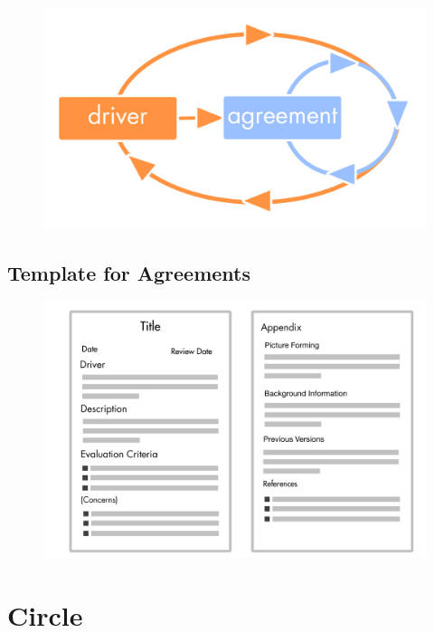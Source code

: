 \begin{figure}[htbp]
\centering
\includegraphics[keepaspectratio,width=\textwidth,height=0.75\textheight]{img/tension-driver-domain/driver-agreement-improvement.png}
\end{figure}

\subsection{Template for Agreements}
\label{templateforagreements}

\begin{figure}[htbp]
\centering
\includegraphics[keepaspectratio,width=\textwidth,height=0.75\textheight]{img/agreements/agreement-template.png}
\end{figure}

\section{Circle}
\label{circle}

